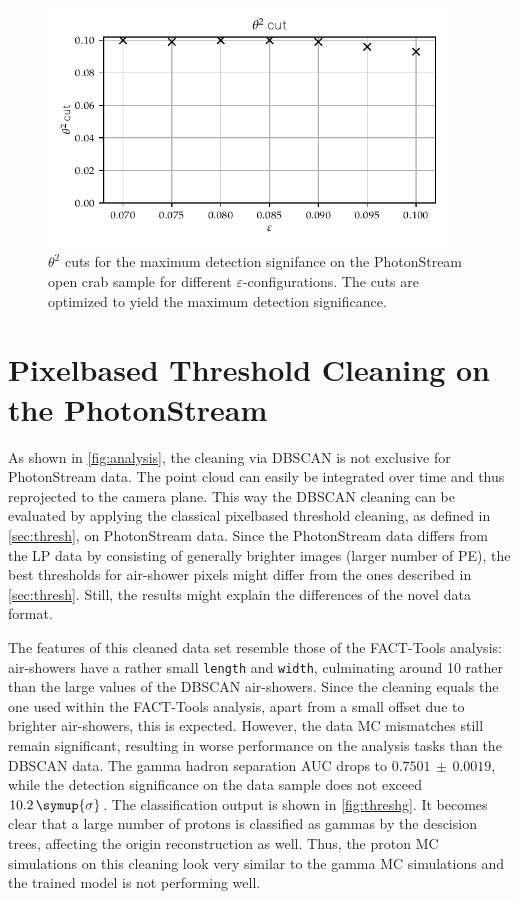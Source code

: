 \begin{figure}
  \centering
  \includegraphics[width=0.95\textwidth]{Plots/Epsilon/eps_theta_cut.pdf}
  \caption{$\theta^2$ cuts for the maximum detection signifance on the PhotonStream open crab sample for different $\varepsilon$-configurations. The cuts are optimized to yield the maximum detection significance.}
  \label{fig:eps_theta}
\end{figure}

\section{Pixelbased Threshold Cleaning on the PhotonStream}
%
As shown in \autoref{fig:analysis}, the cleaning via DBSCAN is not exclusive
for PhotonStream data. The point cloud can easily be integrated over time and
thus reprojected to the camera plane. This way the DBSCAN cleaning can be
evaluated by applying the classical pixelbased threshold cleaning, as defined
in \autoref{sec:thresh}, on PhotonStream data. Since the PhotonStream data
differs from the LP data by consisting of generally brighter images (larger number
of PE), the best thresholds for air-shower pixels might differ from the ones
described in \autoref{sec:thresh}. Still, the results might explain the
differences of the novel data format.

The features of this cleaned data set resemble those of the FACT-Tools
analysis: air-showers have a rather small \texttt{length} and \texttt{width},
culminating around \num{10} rather than the large values of the DBSCAN
air-showers. Since the cleaning equals the one used within the FACT-Tools
analysis, apart from a small offset due to brighter air-showers, this is
expected. However, the data MC mismatches still remain significant, resulting
in worse performance on the analysis tasks than the DBSCAN data. The gamma
hadron separation AUC drops to $0.7501\,\pm\,0.0019$, while the detection
significance on the data sample does not exceed $10.2\,\symup{\sigma}$. The
classification output is shown in \autoref{fig:threshg}. It becomes clear that
a large number of protons is classified as gammas by the descision trees, affecting the origin reconstruction as well. Thus,
the proton MC simulations on this cleaning look very similar to the gamma MC
simulations and the trained model is not performing well.

